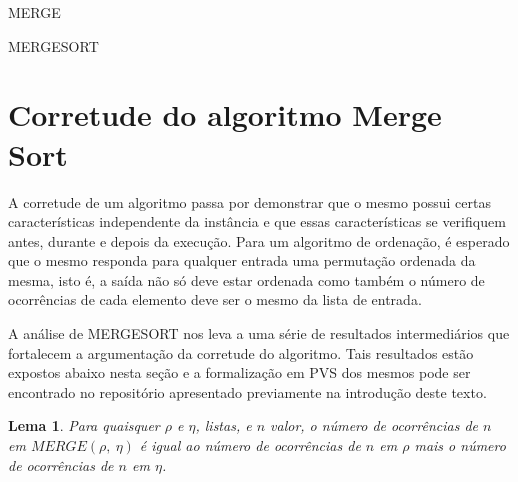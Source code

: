 \documentclass[12pt]{article}
\newtheorem{lemma}[theorem]{Lema}
\theoremstyle{definition}
\begin{document}
\begin{algorithm}[H]
\label{merge_pseudocode}
        \caption{MERGE}
\end{algorithm}

\begin{algorithm}[H]
\label{mergesort_pseudocode}
        \caption{MERGESORT}
\end{algorithm}

\section{Corretude do algoritmo Merge Sort}
\label{correctness}

A corretude de um algoritmo passa por demonstrar que o mesmo possui certas características independente da instância e que essas características
se verifiquem antes, durante e depois da execução. Para um algoritmo de ordenação, é esperado que o mesmo responda para qualquer entrada uma permutação
ordenada da mesma, isto é, a saída não só deve estar ordenada como também o número de ocorrências de cada elemento deve ser o mesmo da lista de entrada.

A análise de MERGESORT nos leva a uma série de resultados intermediários que fortalecem a argumentação da corretude do algoritmo. Tais resultados estão expostos
abaixo nesta seção e a formalização em PVS dos mesmos pode ser encontrado no repositório apresentado previamente na introdução deste texto.

\begin{lemma}
\label{merge-preserves-occurrences}
        Para quaisquer $\rho$ e $\eta$, listas, e $n$ valor, o número de ocorrências de $n$ em $MERGE(\rho,\ \eta)$ é igual ao número de ocorrências
        de $n$ em $\rho$ mais o número de ocorrências de $n$ em $\eta$.
\end{lemma}
\end{document}
